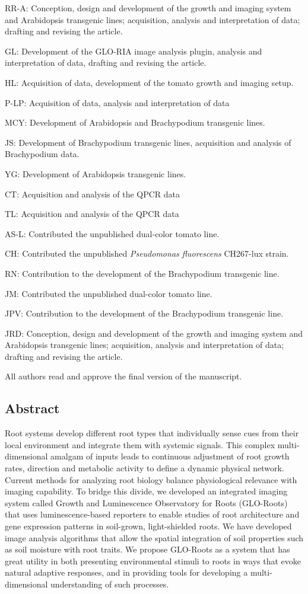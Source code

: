 \documentclass[]{article}
\begin{document}
RR-A: Conception, design and development of the growth and imaging
system and Arabidopsis transgenic lines; acquisition, analysis and
interpretation of data; drafting and revising the article.

GL: Development of the GLO-RIA image analysis plugin, analysis and
interpretation of data, drafting and revising the article.

HL: Acquisition of data, development of the tomato growth and imaging
setup.

P-LP: Acquisition of data, analysis and interpretation of data

MCY: Development of Arabidopsis and Brachypodium transgenic lines.

JS: Development of Brachypodium transgenic lines, acquisition and
analysis of Brachypodium data.

YG: Development of Arabidopsis transgenic lines.

CT: Acquisition and analysis of the QPCR data

TL: Acquisition and analysis of the QPCR data

AS-L: Contributed the unpublished dual-color tomato line.

CH: Contributed the unpublished \emph{Pseudomonas fluorescens} CH267-lux
strain.

RN: Contribution to the development of the Brachypodium transgenic line.

JM: Contributed the unpublished dual-color tomato line.

JPV: Contribution to the development of the Brachypodium transgenic
line.

JRD: Conception, design and development of the growth and imaging system
and Arabidopsis transgenic lines; acquisition, analysis and
interpretation of data; drafting and revising the article.

All authors read and approve the final version of the manuscript.

\subsection{Abstract}\label{abstract}

Root systems develop different root types that individually sense cues
from their local environment and integrate them with systemic signals.
This complex multi-dimensional amalgam of inputs leads to continuous
adjustment of root growth rates, direction and metabolic activity to
define a dynamic physical network. Current methods for analyzing root
biology balance physiological relevance with imaging capability. To
bridge this divide, we developed an integrated imaging system called
Growth and Luminescence Observatory for Roots (GLO-Roots) that uses
luminescence-based reporters to enable studies of root architecture and
gene expression patterns in soil-grown, light-shielded roots. We have
developed image analysis algorithms that allow the spatial integration
of soil properties such as soil moisture with root traits. We propose
GLO-Roots as a system that has great utility in both presenting
environmental stimuli to roots in ways that evoke natural adaptive
responses, and in providing tools for developing a multi-dimensional
understanding of such processes.
\end{document}
